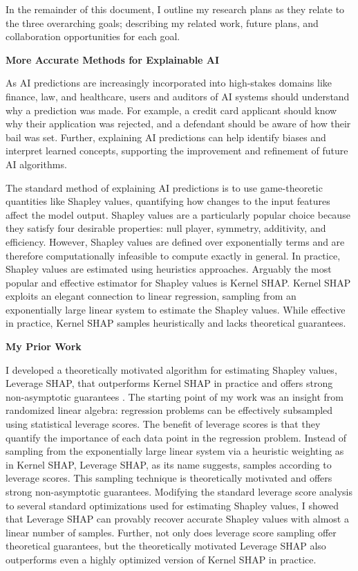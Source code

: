 \documentclass[11pt]{article}
\begin{document}
{In the remainder of this document, I outline my research plans as they relate to the three overarching goals; describing my related work, future plans, and collaboration opportunities for each goal.

\begin{center}
{ \large \textbf{More Accurate Methods for Explainable AI}}
\end{center}

As AI predictions are increasingly incorporated into high-stakes domains like finance, law, and healthcare, users and auditors of AI systems should understand why a prediction was made. For example, a credit card applicant should know why their application was rejected, and a defendant should be aware of how their bail was set. 
Further, explaining AI predictions can help identify biases and interpret learned concepts, supporting the improvement and refinement of future AI algorithms.

The standard method of explaining AI predictions is to use game-theoretic quantities like Shapley values, quantifying how changes to the input features affect the model output.
Shapley values are a particularly popular choice because they satisfy four desirable properties: null player, symmetry, additivity, and efficiency.
However, Shapley values are defined over exponentially terms and are therefore computationally infeasible to compute exactly in general.
In practice, Shapley values are estimated using heuristics approaches.
Arguably the most popular and effective estimator for Shapley values is Kernel SHAP.
Kernel SHAP exploits an elegant connection to linear regression, sampling from an exponentially large linear system to estimate the Shapley values.
While effective in practice, Kernel SHAP samples heuristically and lacks theoretical guarantees.

{ \large \textbf{My Prior Work}}

I developed a theoretically motivated algorithm for estimating Shapley values, Leverage SHAP, that outperforms Kernel SHAP in practice and offers strong non-asymptotic guarantees \cite{musco2024leverage}.
The starting point of my work was an insight from randomized linear algebra: regression problems can be effectively subsampled using statistical leverage scores.
The benefit of leverage scores is that they quantify the importance of each data point in the regression problem.
Instead of sampling from the exponentially large linear system via a heuristic weighting as in Kernel SHAP, Leverage SHAP, as its name suggests, samples according to leverage scores.
This sampling technique is theoretically motivated and offers strong non-asymptotic guarantees.
Modifying the standard leverage score analysis to several standard optimizations used for estimating Shapley values, I showed that Leverage SHAP can provably recover accurate Shapley values with almost a linear number of samples.
Further, not only does leverage score sampling offer theoretical guarantees, but the theoretically motivated Leverage SHAP also outperforms even a highly optimized version of Kernel SHAP in practice.

}
\end{document}
